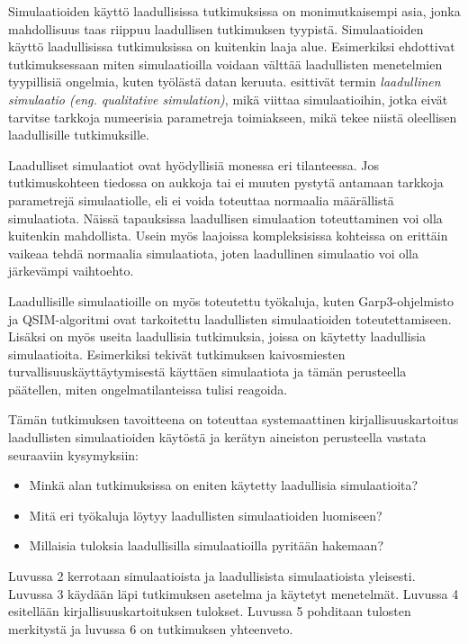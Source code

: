 \documentclass[utf8]{gradu3}
\begin{document}
Simulaatioiden käyttö laadullisissa tutkimuksissa on monimutkaisempi asia, jonka mahdollisuus taas riippuu laadullisen tutkimuksen tyypistä. Simulaatioiden käyttö laadullisissa tutkimuksissa on kuitenkin laaja alue. Esimerkiksi \cite{eldabi2002quantitative} ehdottivat tutkimuksessaan miten simulaatioilla voidaan välttää laadullisten menetelmien tyypillisiä ongelmia, kuten työlästä datan keruuta. \cite{kuipers1986qualitative} esittivät termin \textit{laadullinen simulaatio (eng. qualitative simulation)}, mikä viittaa simulaatioihin, jotka eivät tarvitse tarkkoja numeerisia parametreja toimiakseen, mikä tekee niistä oleellisen laadullisille tutkimuksille.

Laadulliset simulaatiot ovat hyödyllisiä monessa eri tilanteessa. Jos tutkimuskohteen tiedossa on aukkoja tai ei muuten pystytä antamaan tarkkoja parametrejä simulaatiolle, eli ei voida toteuttaa normaalia määrällistä simulaatiota. Näissä tapauksissa laadullisen simulaation toteuttaminen voi olla kuitenkin mahdollista. Usein myös laajoissa kompleksisissa kohteissa on erittäin vaikeaa tehdä normaalia simulaatiota, joten laadullinen simulaatio voi olla järkevämpi vaihtoehto.

Laadullisille simulaatioille on myös toteutettu työkaluja, kuten Garp3-ohjelmisto \parencite{bredeweg2007garp3} ja QSIM-algoritmi \parencite{helgstrand2004qsim} ovat tarkoitettu laadullisten simulaatioiden toteutettamiseen. Lisäksi on myös useita laadullisia tutkimuksia, joissa on käytetty laadullisia simulaatioita. Esimerkiksi \cite{cao2019depth} tekivät tutkimuksen kaivosmiesten turvallisuuskäyttäytymisestä käyttäen simulaatiota ja tämän perusteella päätellen, miten ongelmatilanteissa tulisi reagoida. 

Tämän tutkimuksen tavoitteena on toteuttaa systemaattinen kirjallisuuskartoitus laadullisten simulaatioiden käytöstä ja kerätyn aineiston perusteella vastata seuraaviin kysymyksiin:
\begin{itemize}
    \item Minkä alan tutkimuksissa on eniten käytetty laadullisia simulaatioita?
    \item Mitä eri työkaluja löytyy laadullisten simulaatioiden luomiseen?
    \item Millaisia tuloksia laadullisilla simulaatioilla pyritään hakemaan?
\end{itemize}

Luvussa 2 kerrotaan simulaatioista ja laadullisista simulaatioista yleisesti. Luvussa 3 käydään läpi tutkimuksen asetelma ja käytetyt menetelmät. Luvussa 4 esitellään kirjallisuuskartoituksen tulokset. Luvussa 5 pohditaan tulosten merkitystä ja luvussa 6 on tutkimuksen yhteenveto.
\end{document}

